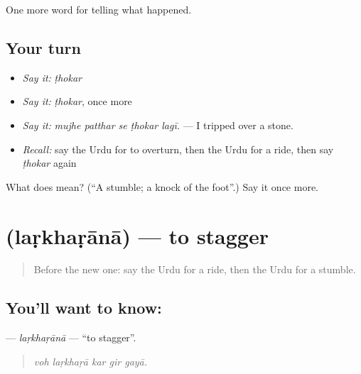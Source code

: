 \begin{grammarlens}[title={What you've built}]
One more word for telling what happened.
\end{grammarlens}

\subsection*{Your turn}
\begin{itemize}
\raggedright
  \item \emph{Say it:} \emph{ṭhokar}
  \item \emph{Say it:} \emph{ṭhokar}, once more
  \item \emph{Say it:} \emph{mujhe patthar se ṭhokar lagī.} — I tripped over a stone.
  \item \emph{Recall:} say the Urdu for to overturn, then the Urdu for a ride, then say \emph{ṭhokar} again
\end{itemize}

\begin{tcolorbox}[breakable,colback=teal!4,colframe=teal!35!black,title={Before you move on}]
What does  mean? (\textquotedblleft{}A stumble; a knock of the foot\textquotedblright{}.) Say it once more.
\end{tcolorbox}
\section[\texorpdfstring{\ur{لڑکھڑانا} (laṛkhaṛānā)}{لڑکھڑانا (laṛkhaṛānā)}]{ (laṛkhaṛānā) — to stagger}

\label{lesson:UR-C285-larkharana}



\begin{quote}
Before the new one: say the Urdu for a ride, then the Urdu for a stumble.
\end{quote}

\subsection*{You'll want to know: }
\textbf{} — \emph{laṛkhaṛānā} — \textquotedblleft{}to stagger\textquotedblright{}.

\begin{quote}
    
\end{quote}

\begin{quote}
\emph{voh laṛkhaṛā kar gir gayā.}
\end{quote}

